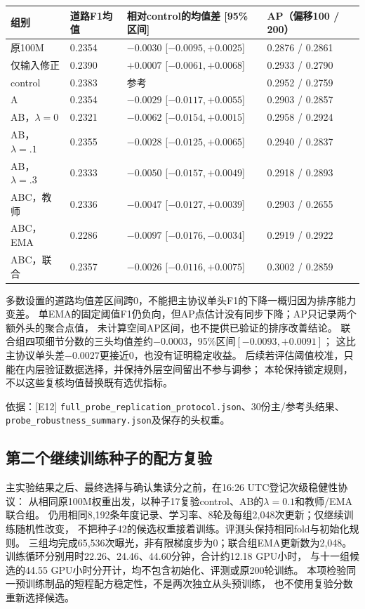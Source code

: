 \documentclass[UTF8,fontset=fandol,zihao=5,a4paper]{ctexart}
\newcommand{\source}[1]{\par{\footnotesize\color{muted}依据：#1}\par}
\begin{document}
\noindent\begin{tabularx}{\linewidth}{@{}p{2.2cm}p{1.65cm}Yp{2.65cm}@{}}
\toprule 组别 & 道路F1均值 & 相对control的均值差 [95\%区间] & AP（偏移100 / 200）\\\midrule
原100M & 0.2354 & $-0.0030$ [$-0.0095,+0.0025$] & 0.2876 / 0.2861\\
仅输入修正 & 0.2390 & $+0.0007$ [$-0.0061,+0.0068$] & 0.2933 / 0.2790\\
control & 0.2383 & 参考 & 0.2952 / 0.2759\\
A & 0.2354 & $-0.0029$ [$-0.0117,+0.0055$] & 0.2903 / 0.2857\\
AB，$\lambda=0$ & 0.2321 & $-0.0062$ [$-0.0154,+0.0015$] & 0.2958 / 0.2924\\
AB，$\lambda=.1$ & 0.2355 & $-0.0028$ [$-0.0125,+0.0065$] & 0.2940 / 0.2837\\
AB，$\lambda=.3$ & 0.2333 & $-0.0050$ [$-0.0157,+0.0049$] & 0.2918 / 0.2893\\
ABC，教师 & 0.2336 & $-0.0047$ [$-0.0127,+0.0039$] & 0.2903 / 0.2655\\
ABC，EMA & 0.2286 & $-0.0097$ [$-0.0176,-0.0034$] & 0.2919 / 0.2922\\
ABC，联合 & 0.2357 & $-0.0026$ [$-0.0116,+0.0075$] & 0.3002 / 0.2859\\\bottomrule
\end{tabularx}

多数设置的道路均值差区间跨0，不能把主协议单头F1的下降一概归因为排序能力变差。
单EMA的固定阈值F1仍负向，但AP点估计没有同步下降；AP只记录两个额外头的聚合点值，
未计算空间AP区间，也不提供已验证的排序改善结论。
联合组四项细节分数的三头均值差约$-0.0003$，95\%区间$[-0.0093,+0.0091]$；
这比主协议单头差$-0.0027$更接近0，也没有证明稳定收益。
后续若评估阈值校准，只能在内层验证数据选择，并保持外层空间留出不参与调参；
本轮保持锁定规则，不以这些复核均值替换既有选优指标。
\source{[E12] \texttt{full\_probe\_replication\_protocol.json}、30份主/参考头结果、
\texttt{probe\_robustness\_summary.json}及保存的头权重。}

\subsection{第二个继续训练种子的配方复验}
主实验结果之后、最终选择与确认集读分之前，在16:26 UTC登记次级稳健性协议：
从相同原100M权重出发，以种子17复验control、AB的$\lambda=0.1$和教师/EMA联合组。
仍用相同8{,}192条年度记录、学习率、8轮及每组2{,}048次更新；仅继续训练随机性改变，
不把种子42的候选权重接着训练。评测头保持相同fold与初始化规则。
三组均完成65{,}536次曝光，非有限梯度步为0；联合组EMA更新数为2{,}048。
训练循环分别用时22.26、24.46、44.60分钟，合计约12.18 GPU小时，
与十一组候选的44.55 GPU小时分开计，均不包含初始化、评测或原200轮训练。
本项检验同一预训练制品的短程配方稳定性，不是两次独立从头预训练，
也不使用复验分数重新选择候选。
\end{document}
